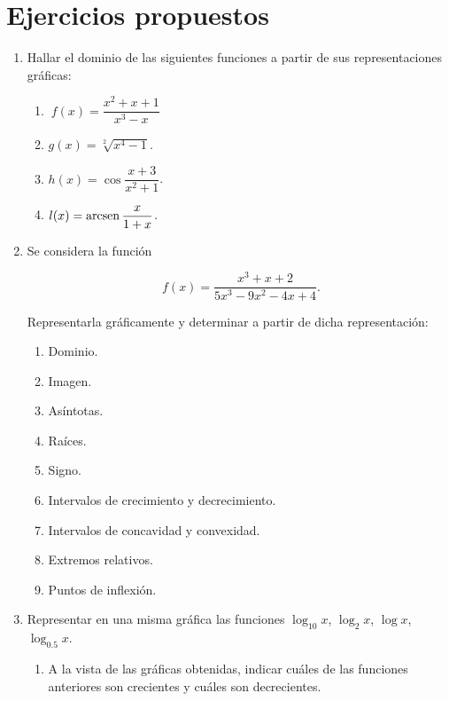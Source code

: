 

\section{Ejercicios propuestos}

\begin{enumerate}[leftmargin=*]
\item Hallar el dominio de las siguientes funciones a partir de sus representaciones gráficas:

\begin{enumerate}
\item
$
\ f(x)=\dfrac{x^{2} + x + 1}{x^{3} - x}
$

\item $g(x)=\sqrt[2]{x^{4}-1}$.

\item $h(x)=\cos{\dfrac{x + 3}{x^{2} + 1}}$.
\item $l(x)=\mathop{\rm arcsen}\nolimits{\dfrac{x}{1+x}}$.
\end{enumerate}


\item Se considera la función

\[
\ f(x)=\frac{x^{3} + x +2}{5x^{3} - 9x^{2} - 4x + 4}.
\]

Representarla gráficamente y determinar a partir de dicha representación:


\begin{enumerate}
\item  Dominio.
\item  Imagen.
\item  Asíntotas.
\item  Raíces.
\item  Signo.
\item  Intervalos de crecimiento y decrecimiento.
\item  Intervalos de concavidad y convexidad.
\item  Extremos relativos.
\item  Puntos de inflexión.
\end{enumerate}

\item Representar en una misma gráfica las funciones $\log_{10}{x}$, $\log_{2}{x}$, $\log{x}$, $\log_{0.5}{x}$.


\begin{enumerate}

\item A la vista de las gráficas obtenidas, indicar cuáles de las funciones anteriores son crecientes y cuáles son decrecientes.


\end{enumerate}
\end{enumerate}
